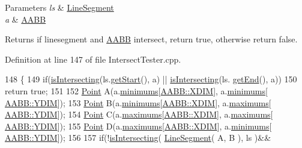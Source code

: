 \begin{DoxyParams}{Parameters}
{\em ls} & \hyperlink{class_line_segment}{Line\+Segment} \\
\hline
{\em a} & \hyperlink{class_a_a_b_b}{A\+A\+BB} \\
\hline
\end{DoxyParams}
\begin{DoxyReturn}{Returns}
if linesegment and \hyperlink{class_a_a_b_b}{A\+A\+BB} intersect, return true, otherwise return false. 
\end{DoxyReturn}


Definition at line 147 of file Intersect\+Tester.\+cpp.


\begin{DoxyCode}
148 \{
149     \textcolor{keywordflow}{if}(\hyperlink{class_intersect_tester_a7710e17ff7d2e229059f23b9429213f5}{isIntersecting}(ls.\hyperlink{class_line_segment_afcff6bd5f6a3073a44f7b21db0be876f}{getStart}(), a) || \hyperlink{class_intersect_tester_a7710e17ff7d2e229059f23b9429213f5}{isIntersecting}(ls.
      \hyperlink{class_line_segment_a7b05f883c369b950e61009edfafbbd0e}{getEnd}(), a))
150         \textcolor{keywordflow}{return} \textcolor{keyword}{true};
151 
152     \hyperlink{class_point}{Point} A(a.\hyperlink{class_a_a_b_b_aaf1ec35e5c0258cd57e65429f93c14a2}{minimums}[\hyperlink{class_a_a_b_b_aac753e0248d039329b25b38d0ed9cd4f}{AABB::XDIM}], a.\hyperlink{class_a_a_b_b_aaf1ec35e5c0258cd57e65429f93c14a2}{minimums}[
      \hyperlink{class_a_a_b_b_a5192e3bdf0789cdc9e5f643b401e5b10}{AABB::YDIM}]);
153     \hyperlink{class_point}{Point} B(a.\hyperlink{class_a_a_b_b_aaf1ec35e5c0258cd57e65429f93c14a2}{minimums}[\hyperlink{class_a_a_b_b_aac753e0248d039329b25b38d0ed9cd4f}{AABB::XDIM}], a.\hyperlink{class_a_a_b_b_a1289c3a2e5c7a98f90d5bcdb8251a06f}{maximums}[
      \hyperlink{class_a_a_b_b_a5192e3bdf0789cdc9e5f643b401e5b10}{AABB::YDIM}]);
154     \hyperlink{class_point}{Point} C(a.\hyperlink{class_a_a_b_b_a1289c3a2e5c7a98f90d5bcdb8251a06f}{maximums}[\hyperlink{class_a_a_b_b_aac753e0248d039329b25b38d0ed9cd4f}{AABB::XDIM}], a.\hyperlink{class_a_a_b_b_a1289c3a2e5c7a98f90d5bcdb8251a06f}{maximums}[
      \hyperlink{class_a_a_b_b_a5192e3bdf0789cdc9e5f643b401e5b10}{AABB::YDIM}]);
155     \hyperlink{class_point}{Point} D(a.\hyperlink{class_a_a_b_b_a1289c3a2e5c7a98f90d5bcdb8251a06f}{maximums}[\hyperlink{class_a_a_b_b_aac753e0248d039329b25b38d0ed9cd4f}{AABB::XDIM}], a.\hyperlink{class_a_a_b_b_aaf1ec35e5c0258cd57e65429f93c14a2}{minimums}[
      \hyperlink{class_a_a_b_b_a5192e3bdf0789cdc9e5f643b401e5b10}{AABB::YDIM}]);
156 
157     \textcolor{keywordflow}{if}(!\hyperlink{class_intersect_tester_a7710e17ff7d2e229059f23b9429213f5}{isIntersecting}( \hyperlink{class_line_segment}{LineSegment}( A, B ), ls )&&

\end{DoxyCode}
